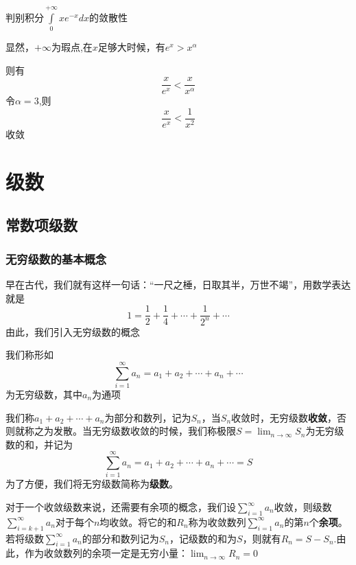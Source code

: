 \documentclass[lang=cn,10pt]{elegantbook}
\begin{document}
\begin{example}
	判别积分$\int\limits_0^{+\infty}{xe^{-x}dx}$的敛散性
\end{example}
\begin{solution}
	
	显然，$+\infty$为瑕点,在$x$足够大时候，有$e^{x}>x^{\alpha}$
	
	则有
	\begin{equation*}
		\frac{x}{e^{x}}<\frac{x}{x^{\alpha}}
	\end{equation*}
	令$\alpha=3$,则
	\begin{equation*}
		\frac{x}{e^{x}}<\frac{1}{x^{2}}
	\end{equation*}
	收敛
\end{solution}
\chapter{级数}
\section{常数项级数}
\subsection{无穷级数的基本概念}
早在古代，我们就有这样一句话：“一尺之棰，日取其半，万世不竭”，用数学表达就是
\begin{equation*}
	1=\frac{1}{2}+\frac{1}{4}+\cdots+\frac{1}{2^{n}}+\cdots
\end{equation*}
由此，我们引入无穷级数的概念
\begin{definition}[无穷级数]
	我们称形如
	\begin{equation*}
		\sum_{i=1}^{\infty}{a_n}=a_1+a_2+\cdots +a_n+\cdots 
	\end{equation*}
	为无穷级数，其中$a_{n}$为通项
\end{definition}
我们称$a_1+a_2+\cdots +a_n$为部分和数列，记为$S_{n}$，当$S_{n}$收敛时，无穷级数\textbf{收敛}，否则就称之为发散。当无穷级数收敛的时候，我们称极限$S=\lim_{n\rightarrow \infty} S_n$为无穷级数的和，并记为
\begin{equation*}
	\sum_{i=1}^{\infty}{a_n}=a_1+a_2+\cdots +a_n+\cdots=S
\end{equation*}
为了方便，我们将无穷级数简称为\textbf{级数}。

对于一个收敛级数来说，还需要有余项的概念，我们设$\sum_{i=1}^{\infty}{a_n}$收敛，则级数$\sum_{i=k+1}^{\infty}{a_n}$对于每个$n$均收敛。将它的和$R_{n}$称为收敛数列$\sum_{i=1}^{\infty}{a_n}$的第$n$个\textbf{余项}。若将级数$\sum_{i=1}^{\infty}{a_n}$的部分和数列记为$S_{n}$，记级数的和为$S$，则就有$R_{n}=S-S_{n}$.由此，作为收敛数列的余项一定是无穷小量：$\lim_{n\rightarrow \infty} R_n=0$
\end{document}
